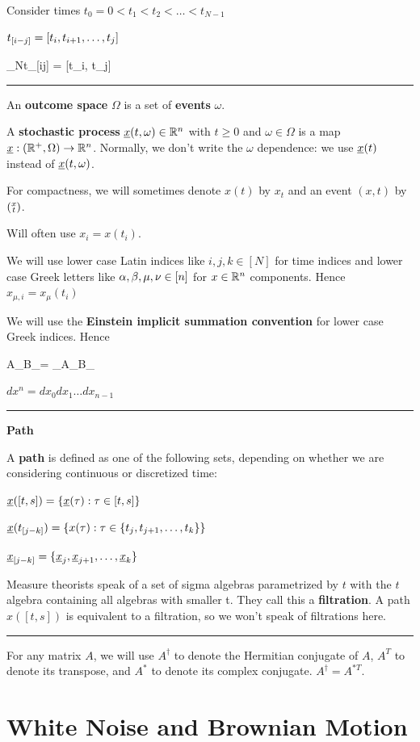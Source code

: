 Consider times $t_0=0<t_1<t_2<\ldots < t_{N-1}$



$t_{[i- j]} = [t_i, t_{i+1}, \ldots, t_j]$


\beq
\lim_{N\rarrow \infty}t_{[i\upto j]} =
[t_i, t_j]
\eeq
\hrule{}

An {\bf outcome space} $\Omega$
is a set of {\bf events} $\omega$.

A {\bf stochastic process} $\rvx(t, \omega)\in\RR^n$ with $t\geq 0$ and $\omega\in\Omega$ is a map $\rvx:(\RR^+,\Omega) \rarrow \RR^n$. Normally, we don't write the $\omega$ dependence: we use $\rvx(t)$ instead of $\rvx(t, \omega)$.

For compactness, we will sometimes denote $x(t)$ by $x_t$ and an event $(x,t)$ by  $({\substack{x\\t}})$.

Will often use $x_i=x(t_i)$.

We will use lower case Latin indices like $i,j,k\in [N]$ for time indices
and lower case Greek letters like $\alpha, \beta, \mu, \nu\in[n]$  for $x\in{ \mathbb{R}}^n$ components.
Hence $x_{\mu, i}=x_\mu(t_i)$

We will use the {\bf Einstein implicit summation
convention} for lower case Greek indices.
Hence

\beq
A_\mu B_\mu = \sum_{\mu \in[n]}A_\mu B_\mu
\eeq


$dx^n = dx_0 dx_1 \ldots dx_{n-1}$
\hrule\noindent
{\bf Path}

A {\bf path} is defined as one of the following sets, depending on whether we are considering continuous or discretized time:

$\rvx([t,s])=\{  \rvx(\tau): \tau\in[t,s]\}$


$\rvx(t_{[j\upto k]}) =\{  x(\tau): \tau\in\{t_j, t_{j+1}, \ldots, t_k\}\}$

$\rvx_{[j\upto k]} =\{ \rvx_j, \rvx_{j+1},
\ldots,\rvx_k\}$

Measure theorists speak of a set of sigma algebras
parametrized by $t$
with the $t$ algebra
containing
all algebras with smaller t.
 They call this a {\bf filtration}. A path $x([t, s])$ is equivalent to a filtration,
so we won't speak of filtrations here.
\hrule
For any matrix $A$,
we will use $A^\dagger$ to denote the Hermitian conjugate of $A$, $A^T$ to denote its transpose, and $A^*$ to denote its complex conjugate. $A^\dagger = A^{* T}$.


 \section{White Noise and Brownian Motion}

